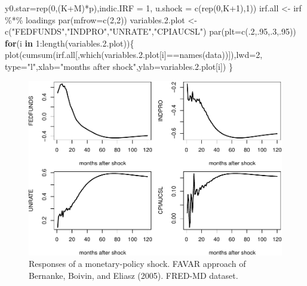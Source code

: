 \documentclass[
  12pt,
]{book}
\newenvironment{Shaded}{\begin{snugshade}}{\end{snugshade}}
\newcommand{\AttributeTok}[1]{\textcolor[rgb]{0.77,0.63,0.00}{#1}}
\newcommand{\ControlFlowTok}[1]{\textcolor[rgb]{0.13,0.29,0.53}{\textbf{#1}}}
\newcommand{\DecValTok}[1]{\textcolor[rgb]{0.00,0.00,0.81}{#1}}
\newcommand{\FloatTok}[1]{\textcolor[rgb]{0.00,0.00,0.81}{#1}}
\newcommand{\FunctionTok}[1]{\textcolor[rgb]{0.00,0.00,0.00}{#1}}
\newcommand{\NormalTok}[1]{#1}
\newcommand{\OtherTok}[1]{\textcolor[rgb]{0.56,0.35,0.01}{#1}}
\newcommand{\SpecialCharTok}[1]{\textcolor[rgb]{0.00,0.00,0.00}{#1}}
\newcommand{\StringTok}[1]{\textcolor[rgb]{0.31,0.60,0.02}{#1}}
\theoremstyle{definition}
\theoremstyle{definition}
\theoremstyle{definition}
\theoremstyle{definition}
\theoremstyle{remark}
\begin{document}
\begin{Shaded}
\begin{Highlighting}[]
                 \AttributeTok{y0.star=}\FunctionTok{rep}\NormalTok{(}\DecValTok{0}\NormalTok{,(K}\SpecialCharTok{+}\NormalTok{M)}\SpecialCharTok{*}\NormalTok{p),}\AttributeTok{indic.IRF =} \DecValTok{1}\NormalTok{,}
                 \AttributeTok{u.shock =} \FunctionTok{c}\NormalTok{(}\FunctionTok{rep}\NormalTok{(}\DecValTok{0}\NormalTok{,K}\SpecialCharTok{+}\DecValTok{1}\NormalTok{),}\DecValTok{1}\NormalTok{))}
\NormalTok{irf.all }\OtherTok{\textless{}{-}}\NormalTok{ irf }\SpecialCharTok{\%*\%}\NormalTok{ loadings}
\FunctionTok{par}\NormalTok{(}\AttributeTok{mfrow=}\FunctionTok{c}\NormalTok{(}\DecValTok{2}\NormalTok{,}\DecValTok{2}\NormalTok{))}
\NormalTok{variables.}\FloatTok{2.}\NormalTok{plot }\OtherTok{\textless{}{-}} \FunctionTok{c}\NormalTok{(}\StringTok{"FEDFUNDS"}\NormalTok{,}\StringTok{"INDPRO"}\NormalTok{,}\StringTok{"UNRATE"}\NormalTok{,}\StringTok{"CPIAUCSL"}\NormalTok{)}
\FunctionTok{par}\NormalTok{(}\AttributeTok{plt=}\FunctionTok{c}\NormalTok{(.}\DecValTok{2}\NormalTok{,.}\DecValTok{95}\NormalTok{,.}\DecValTok{3}\NormalTok{,.}\DecValTok{95}\NormalTok{))}
\ControlFlowTok{for}\NormalTok{(i }\ControlFlowTok{in} \DecValTok{1}\SpecialCharTok{:}\FunctionTok{length}\NormalTok{(variables.}\FloatTok{2.}\NormalTok{plot))\{}
  \FunctionTok{plot}\NormalTok{(}\FunctionTok{cumsum}\NormalTok{(irf.all[,}\FunctionTok{which}\NormalTok{(variables.}\FloatTok{2.}\NormalTok{plot[i]}\SpecialCharTok{==}\FunctionTok{names}\NormalTok{(data))]),}\AttributeTok{lwd=}\DecValTok{2}\NormalTok{,}
       \AttributeTok{type=}\StringTok{"l"}\NormalTok{,}\AttributeTok{xlab=}\StringTok{"months after shock"}\NormalTok{,}\AttributeTok{ylab=}\NormalTok{variables.}\FloatTok{2.}\NormalTok{plot[i])}
\NormalTok{\}}
\end{Highlighting}
\end{Shaded}

\begin{figure}
\includegraphics[width=0.95\linewidth]{IdentifStructShocks_files/figure-latex/FAVAR-1} \caption{Responses of a monetary-policy shock. FAVAR approach of Bernanke, Boivin, and Eliasz (2005). FRED-MD dataset.}\label{fig:FAVAR}
\end{figure}
\end{document}

